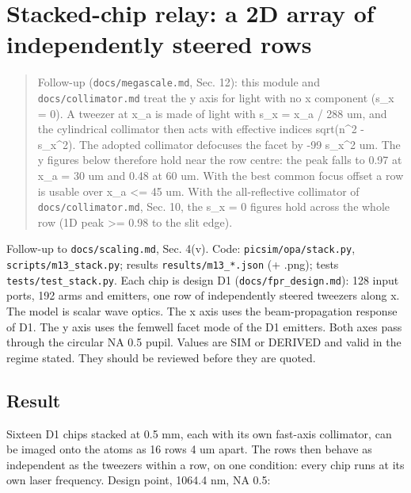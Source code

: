 \hypertarget{stacked-chip-relay-a-2d-array-of-independently-steered-rows}{%
\chapter{Stacked-chip relay: a 2D array of independently steered
rows}\label{stacked_relay-stacked-chip-relay-a-2d-array-of-independently-steered-rows}}

\begin{quote}
Follow-up (\texttt{docs/megascale.md}, Sec. 12): this module and
\texttt{docs/collimator.md} treat the y axis for light with no x
component (s\_x = 0). A tweezer at x\_a is made of light with s\_x =
x\_a / 288 um, and the cylindrical collimator then acts with effective
indices sqrt(n\^{}2 - s\_x\^{}2). The adopted collimator defocuses the
facet by -99 s\_x\^{}2 um. The y figures below therefore hold near the
row centre: the peak falls to 0.97 at x\_a = 30 um and 0.48 at 60 um.
With the best common focus offset a row is usable over
\textbar x\_a\textbar{} \textless= 45 um. With the all-reflective
collimator of \texttt{docs/collimator.md}, Sec. 10, the s\_x = 0 figures
hold across the whole row (1D peak \textgreater= 0.98 to the slit edge).
\end{quote}

Follow-up to \texttt{docs/scaling.md}, Sec. 4(v). Code:
\texttt{picsim/opa/stack.py}, \texttt{scripts/m13\_stack.py}; results
\texttt{results/m13\_*.json} (+ .png); tests
\texttt{tests/test\_stack.py}. Each chip is design D1
(\texttt{docs/fpr\_design.md}): 128 input ports, 192 arms and emitters,
one row of independently steered tweezers along x. The model is scalar
wave optics. The x axis uses the beam-propagation response of D1. The y
axis uses the femwell facet mode of the D1 emitters. Both axes pass
through the circular NA 0.5 pupil. Values are SIM or DERIVED and valid
in the regime stated. They should be reviewed before they are quoted.

\hypertarget{1-result}{%
\section{Result}\label{stacked_relay-1-result}}

Sixteen D1 chips stacked at 0.5 mm, each with its own fast-axis
collimator, can be imaged onto the atoms as 16 rows 4 um apart. The rows
then behave as independent as the tweezers within a row, on one
condition: every chip runs at its own laser frequency. Design point,
1064.4 nm, NA 0.5:

